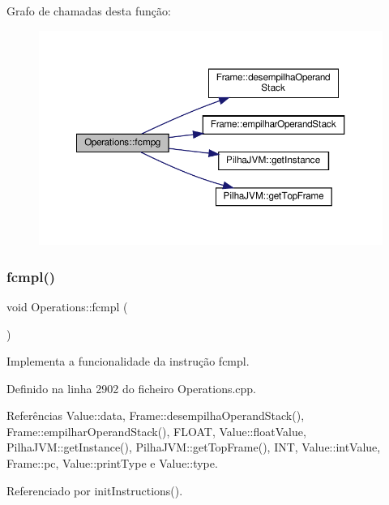 Grafo de chamadas desta função\+:\nopagebreak
\begin{figure}[H]
\begin{center}
\leavevmode
\includegraphics[width=350pt]{classOperations_a7825305c331404b97ef209a6e6d988ab_cgraph}
\end{center}
\end{figure}
\mbox{\label{classOperations_aa4a8e2be93a5cc69e40f483958014e39}} 
\subsubsection{\texorpdfstring{fcmpl()}{fcmpl()}}
{\footnotesize\ttfamily void Operations\+::fcmpl (\begin{DoxyParamCaption}{ }\end{DoxyParamCaption})\hspace{0.3cm}{\ttfamily [private]}}



Implementa a funcionalidade da instrução fcmpl. 



Definido na linha 2902 do ficheiro Operations.\+cpp.



Referências Value\+::data, Frame\+::desempilha\+Operand\+Stack(), Frame\+::empilhar\+Operand\+Stack(), F\+L\+O\+AT, Value\+::float\+Value, Pilha\+J\+V\+M\+::get\+Instance(), Pilha\+J\+V\+M\+::get\+Top\+Frame(), I\+NT, Value\+::int\+Value, Frame\+::pc, Value\+::print\+Type e Value\+::type.



Referenciado por init\+Instructions().

